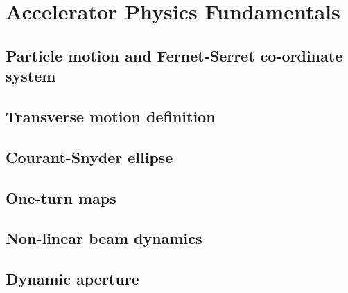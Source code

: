 
\chapter{Accelerator Physics Fundamentals}\label{ch:accelerator_physics_fundamentals}

\section{Particle motion and Fernet-Serret co-ordinate system}

\section{Transverse motion definition}

\section{Courant-Snyder ellipse}

\section{One-turn maps}

\section{Non-linear beam dynamics}

\section{Dynamic aperture}
